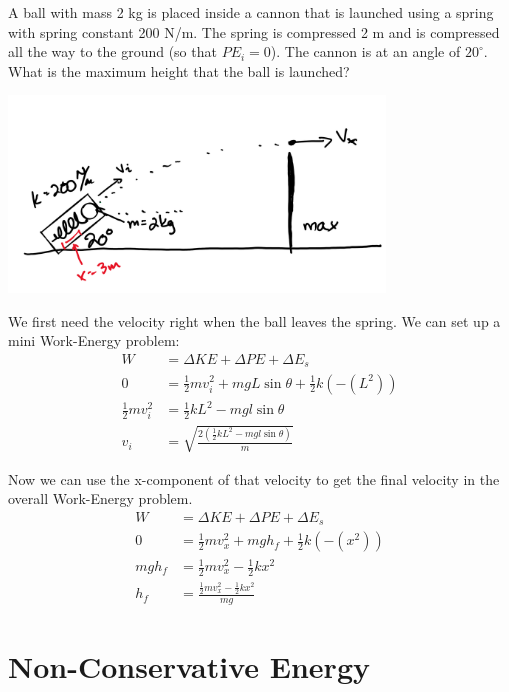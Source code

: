 \begin{problem}
    A ball with mass 2 kg is placed inside a cannon that is launched using a spring with spring constant 200 N/m. The spring is compressed 2 m and is compressed all the way to the ground (so that $PE_i = 0$). The cannon is at an angle of $20^\circ$. What is the maximum height that the ball is launched?

    \begin{center}
        \includegraphics[width=0.75\textwidth]{chapters/ch4/images/fig4_11.PNG}
    \end{center}

    We first need the velocity right when the ball leaves the spring. We can set up a mini Work-Energy problem:
    $$
    \begin{aligned}
        W &= \Delta KE + \Delta PE + \Delta E_s\\
        0 &= \frac{1}{2}mv_i^2 + mgL\sin\theta + \frac{1}{2}k(-(L^2))\\
        \frac{1}{2}mv_i^2 &= \frac{1}{2}kL^2 - mgl\sin\theta\\
        v_i &= \sqrt{\frac{2\left(\frac{1}{2}kL^2 - mgl\sin\theta\right)}{m}}
    \end{aligned}
    $$


    Now we can use the x-component of that velocity to get the final velocity in the overall Work-Energy problem.
    $$
    \begin{aligned}
        W &= \Delta KE + \Delta PE + \Delta E_s\\
        0 &= \frac{1}{2}mv_x^2 + mgh_f + \frac{1}{2}k(-(x^2))\\
        mgh_f &= \frac{1}{2}mv_x^2 -\frac{1}{2}kx^2\\
        h_f &= \frac{\frac{1}{2}mv_x^2 -\frac{1}{2}kx^2}{mg}
    \end{aligned}
    $$
\end{problem}


\section{Non-Conservative Energy}

